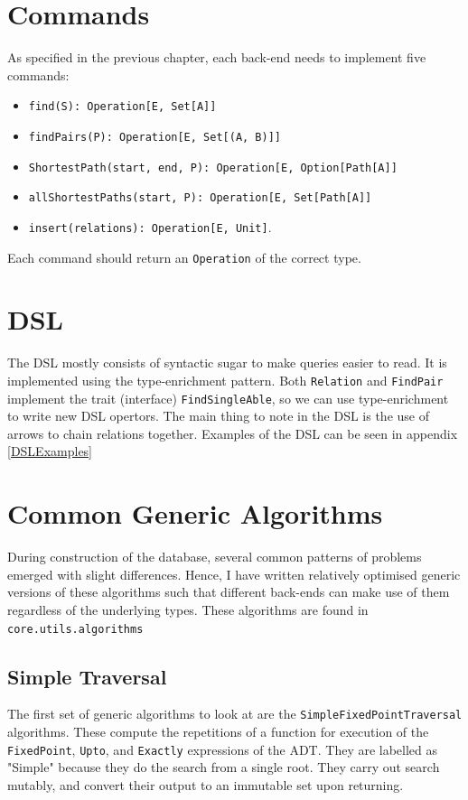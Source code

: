 \documentclass[12pt,a4paper,twoside,openright]{report}
\newcommand\codeName[1]{\texttt{#1}}
\begin{document}
\section{Commands}
As specified in the previous chapter, each back-end needs to implement five commands: 
\begin{itemize}
\item \codeName{find(S): Operation[E, Set[A]]}
\item \codeName{findPairs(P): Operation[E, Set[(A, B)]]}
\item \codeName{ShortestPath(start, end, P): Operation[E, Option[Path[A]]}
\item \codeName{allShortestPaths(start, P): Operation[E, Set[Path[A]]}
\item \codeName{insert(relations): Operation[E, Unit]}.
\end{itemize}
Each command should return an \codeName{Operation} of the correct type.
\section{DSL}
The DSL mostly consists of syntactic sugar to make queries easier to read. It is implemented using the type-enrichment pattern. Both \codeName{Relation} and \codeName{FindPair} implement the trait (interface) \codeName{FindSingleAble}, so we can use type-enrichment to write new DSL opertors. The main thing to note in the DSL is the use of arrows to chain relations together. Examples of the DSL can be seen in appendix \ref{DSLExamples}

\section{Common Generic Algorithms}
During construction of the database, several common patterns of problems emerged with slight differences. Hence, I have written relatively optimised generic versions of these algorithms such that different back-ends can make use of them regardless of the underlying types. These algorithms are found in \codeName{core.utils.algorithms}


	\subsection{Simple Traversal}\label{SimpleFixedPoint}
	The first set of generic algorithms to look at are the \codeName{SimpleFixedPointTraversal} algorithms. These compute the repetitions of a function for execution of the \codeName{FixedPoint}, \codeName{Upto}, and \codeName{Exactly} expressions of the ADT. They are labelled as "Simple" because they do the search from a single root. They carry out search mutably, and convert their output to an immutable set upon returning.
	
\end{document}
